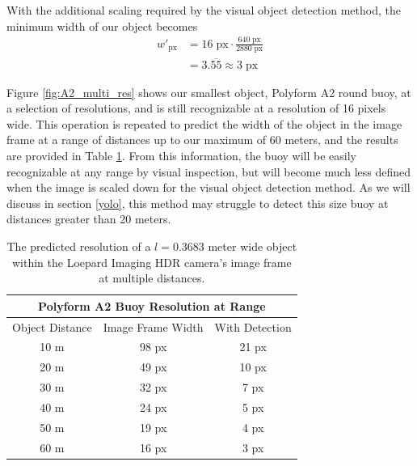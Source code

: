 \documentclass{erauthesis}
\begin{document}
With the additional scaling required by the visual object detection method, the minimum width of our object becomes 
\begin{equation*}
\begin{split}
    \mathit{w}'_{\text{px}} & = 16\;\text{px} \cdot \frac{640\;\text{px}}{2880\;\text{px}} \\
     & = 3.\overline{55} \approx 3 \;\text{px}
\end{split}
\end{equation*}

Figure \ref{fig:A2_multi_res} shows our smallest object, Polyform A2 round buoy, at a selection of resolutions, and is still recognizable at a resolution of 16 pixels wide. %
This operation is repeated to predict the width of the object in the image frame at a range of distances up to our maximum of 60 meters, and the results are provided in Table \ref{table:buoy_res}.
From this information, the buoy will be easily recognizable at any range by visual inspection, but will become much less defined when the image is scaled down for the visual object detection method.
As we will discuss in section \ref{yolo}, this method may struggle to detect this size buoy at distances greater than 20 meters.

\begin{table}[htpb]
\centering
\begin{tabular}{c|c|c}
\hline
\multicolumn{3}{c}{Polyform A2 Buoy Resolution at Range}\\
\hline
\hline
Object Distance & Image Frame Width & With Detection \\
\hline
10 m & 98 px & 21 px \\
20 m & 49 px & 10 px \\
30 m & 32 px & 7 px \\
40 m & 24 px & 5 px \\
50 m & 19 px & 4 px \\
60 m & 16 px & 3 px \\
\hline
\end{tabular}
\caption{The predicted resolution of a $\mathit{l} = 0.3683$ meter wide object within the Loepard Imaging HDR camera's image frame at multiple distances.}
\label{table:buoy_res}
\end{table}
\end{document}
